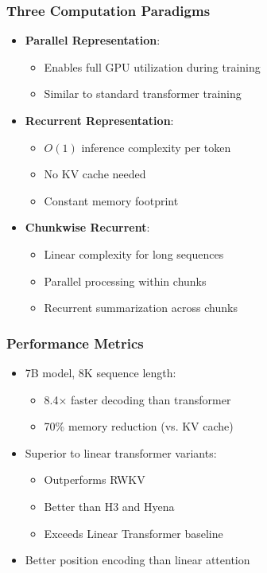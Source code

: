\documentclass[11pt]{article}
\begin{document}
\subsubsection{Three Computation Paradigms}
\begin{itemize}[leftmargin=*]
    \item \textbf{Parallel Representation}:
    \begin{itemize}
        \item Enables full GPU utilization during training
        \item Similar to standard transformer training
    \end{itemize}
    \item \textbf{Recurrent Representation}:
    \begin{itemize}
        \item $O(1)$ inference complexity per token
        \item No KV cache needed
        \item Constant memory footprint
    \end{itemize}
    \item \textbf{Chunkwise Recurrent}:
    \begin{itemize}
        \item Linear complexity for long sequences
        \item Parallel processing within chunks
        \item Recurrent summarization across chunks
    \end{itemize}
\end{itemize}

\subsubsection{Performance Metrics}
\begin{itemize}[leftmargin=*]
    \item 7B model, 8K sequence length:
    \begin{itemize}
        \item 8.4× faster decoding than transformer
        \item 70\% memory reduction (vs. KV cache)
    \end{itemize}
    \item Superior to linear transformer variants:
    \begin{itemize}
        \item Outperforms RWKV
        \item Better than H3 and Hyena
        \item Exceeds Linear Transformer baseline
    \end{itemize}
    \item Better position encoding than linear attention
\end{itemize}
\end{document}
